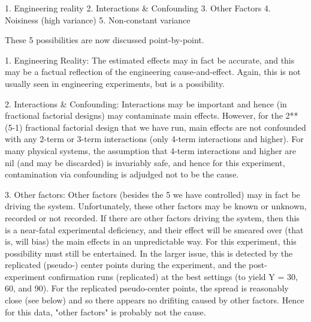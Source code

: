       1. Engineering reality
      2. Interactions & Confounding
      3. Other Factors
      4. Noisiness (high variance)
      5. Non-constant variance

   These 5 possibilities are now discussed point-by-point.

      1. Engineering Reality: The estimated effects
         may in fact be accurate, and this may be a
         factual reflection of the engineering
         cause-and-effect.  Again, this is not
         usually seen in engineering experiments, but
         is a possibility.

      2. Interactions & Confounding: Interactions may
         be important and hence (in fractional
         factorial designs) may contaminate main
         effects.  However, for the 2**(5-1)
         fractional factorial design that we have
         run, main effects are not confounded with
         any 2-term or 3-term interactions (only
         4-term interactions and higher).  For many
         physical systems, the assumption that 4-term
         interactions and higher are nil (and may be
         discarded) is invariably safe, and hence for
         this experiment, contamination via
         confounding is adjudged not to be the cause.

      3. Other factors: Other factors (besides the 5
         we have controlled) may in fact be driving
         the system.  Unfortunately, these other
         factors may be known or unknown, recorded or
         not recorded.  If there are other factors
         driving the system, then this is a
         near-fatal experimental deficiency, and their
         effect will be smeared over (that is, will
         bias) the main effects in an
         unpredictable way.  For this experiment,
         this possibility must still be entertained.
         In the larger issue, this is detected by the
         replicated (pseudo-) center points during
         the experiment, and the post-experiment
         confirmation runs (replicated) at the best
         settings (to yield Y = 30, 60, and 90).  For
         the replicated pseudo-center points, the
         spread is reasonably close (see below) and
         so there appears no drifiting caused by
         other factors.  Hence for this data, "other
         factors" is probably not the cause.

